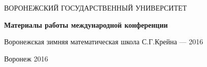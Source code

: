 \begin{titlepage}
   \begin{center}
   ВОРОНЕЖСКИЙ ГОСУДАРСТВЕННЫЙ УНИВЕРСИТЕТ
   \end{center}
\vspace{60mm}

    \begin{center}
      {\LARGE
      \bf

{\bf Материалы работы международной конференции}

 Воронежская зимняя математическая школа С.Г.Крейна --- 2016}

\vspace{10mm}


  \end{center}

 \begin{center}
   \vspace{20mm} Воронеж 2016
 \end{center}
\end{titlepage}
